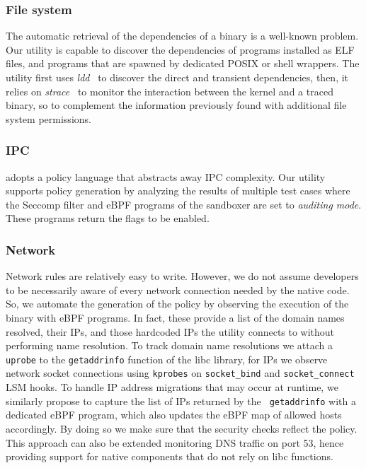 \subsubsection*{File system}

The automatic retrieval of the dependencies of a binary is a
well-known problem. Our utility is capable to discover the
dependencies of programs installed as ELF files, and programs that are
spawned by dedicated POSIX or shell wrappers. The utility first uses
{\em ldd}~\cite{linux-ldd} to discover the direct and transient
dependencies, then, it relies on {\em strace}~\cite{linux-strace} to
monitor the interaction between the kernel and a traced binary, so to
complement the information previously found with additional
file system permissions.

\subsubsection*{IPC}

\natisand adopts a policy language that abstracts away IPC complexity.  Our
utility supports policy generation by analyzing the results of
multiple test cases where the Seccomp filter and eBPF
programs of the sandboxer are set to {\em auditing mode}.  These
programs return the flags to be enabled.

\subsubsection*{Network}

Network rules are relatively easy to write. However, we do not
assume developers to be necessarily aware of every network connection
needed by the native code. So, we automate the generation of the
policy by observing the execution of the binary with eBPF programs.
In fact, these provide a list of the domain names resolved, their IPs,
and those hardcoded IPs the utility connects to without performing
name resolution. To track domain name resolutions we attach a {\tt 
  uprobe} to the {\tt getaddrinfo} function of the libc library,
for IPs we observe network socket connections using {\tt kprobes} on
{\tt socket\_bind} and {\tt socket\_connect} LSM hooks.
%
 To handle IP address migrations that may occur at runtime,
  we similarly propose to capture the list of IPs returned by the {\tt
    getaddrinfo} with a dedicated eBPF program, which also updates the
  eBPF map of allowed hosts accordingly. By doing so we make sure that
  the security checks reflect the policy. This approach can also be
  extended monitoring DNS traffic on port 53, hence providing support
  for native components that do not rely on libc functions.  

